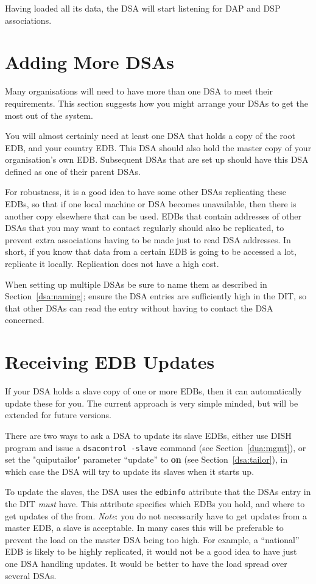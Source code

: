 Having loaded all its data, the DSA will start listening for DAP and DSP
associations.

\section {Adding More DSAs}

Many organisations will need to have more than one DSA to meet 
their requirements. This section suggests how you might arrange your
DSAs to get the most out of the system.

You will almost certainly need at least one DSA that holds a
copy of the root EDB, and your country EDB.
This DSA should also hold the master copy of your organisation's own EDB.
Subsequent DSAs that are set up should have this DSA defined 
as one of their parent DSAs.

For robustness, it is a good idea to have some other DSAs replicating 
these EDBs, so that if one local machine or DSA becomes unavailable, then
there is another copy elsewhere that can be used.
EDBs that contain addresses of other DSAs that you may want to contact
regularly should also be replicated, to prevent extra associations
having to be made just to read DSA addresses.
In short, if you know that data from a certain 
EDB is going to be accessed a lot, replicate it locally.
Replication does not have a high cost.

When setting up multiple DSAs be sure to name them as described in 
Section~\ref{dsa:naming};
ensure the DSA entries are sufficiently high in the DIT, so that other DSAs
can read the entry without having to contact the DSA concerned.

\section {Receiving EDB Updates}
\label{slave_update}
If your DSA holds a slave copy of one or more EDBs, then it can
automatically update these for you.
The current approach is very simple minded, but will be extended for future
versions.

There are two ways to ask a DSA to update its slave EDBs, either use DISH
program and issue a \verb+dsacontrol -slave+ command (see 
Section~\ref{dua:mgmt}), or set the \file"quiputailor" parameter
``update'' to {\bf on} (see Section~\ref{dsa:tailor}),
in which case the DSA will try to update its slaves
when it starts up.

To update the slaves, the DSA uses the \verb+edbinfo+ attribute that the DSAs
entry in the DIT {\em must} have.
This attribute specifies which EDBs you hold, and where to get updates of
the from.
{\em Note}: you do not necessarily have to get updates from a master EDB,  
a slave is acceptable.
In many cases this will be preferable to prevent the 
load on the master DSA being too high.
For example, a ``national'' EDB is likely to be highly replicated,
it would not be a good idea to have just one DSA
handling updates.  It would be better to have the load spread over several
DSAs.

